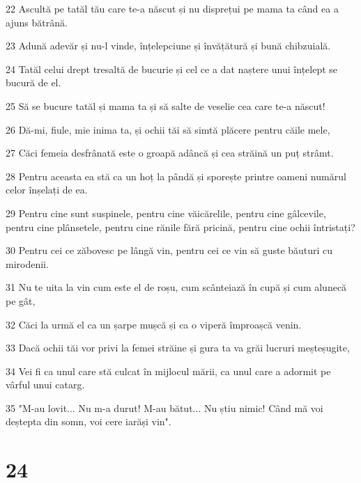 \par 22 Ascultă pe tatăl tău care te-a născut și nu disprețui pe mama ta când ea a ajuns bătrână.
\par 23 Adună adevăr și nu-l vinde, înțelepciune și învățătură și bună chibzuială.
\par 24 Tatăl celui drept tresaltă de bucurie și cel ce a dat naștere unui înțelept se bucură de el.
\par 25 Să se bucure tatăl și mama ta și să salte de veselie cea care te-a născut!
\par 26 Dă-mi, fiule, mie inima ta, și ochii tăi să simtă plăcere pentru căile mele,
\par 27 Căci femeia desfrânată este o groapă adâncă și cea străină un puț strâmt.
\par 28 Pentru aceasta ea stă ca un hoț la pândă și sporește printre oameni numărul celor înșelați de ea.
\par 29 Pentru cine sunt suspinele, pentru cine văicărelile, pentru cine gâlcevile, pentru cine plânsetele, pentru cine rănile fără pricină, pentru cine ochii întristați?
\par 30 Pentru cei ce zăbovesc pe lângă vin, pentru cei ce vin să guste băuturi cu mirodenii.
\par 31 Nu te uita la vin cum este el de roșu, cum scânteiază în cupă și cum alunecă pe gât,
\par 32 Căci la urmă el ca un șarpe mușcă și ca o viperă împroașcă venin.
\par 33 Dacă ochii tăi vor privi la femei străine și gura ta va grăi lucruri meșteșugite,
\par 34 Vei fi ca unul care stă culcat în mijlocul mării, ca unul care a adormit pe vârful unui catarg.
\par 35 "M-au lovit... Nu m-a durut! M-au bătut... Nu știu nimic! Când mă voi deștepta din somn, voi cere iarăși vin".

\chapter{24}

